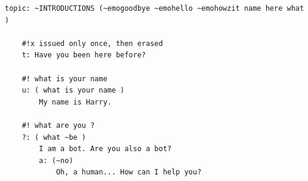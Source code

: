 \begin{center} 
  \begin{lstlisting}[language={}, captionpos=b, caption=Example topic file, label=listing:exampletop]   
    topic: ~INTRODUCTIONS (~emogoodbye ~emohello ~emohowzit name here what )
    
    #!x issued only once, then erased
    t: Have you been here before?
    
    #! what is your name 
    u: ( what is your name ) 
        My name is Harry.
        
    #! what are you ?
    ?: ( what ~be )
        I am a bot. Are you also a bot?
        a: (~no)
            Oh, a human... How can I help you?
  \end{lstlisting}
\end{center}

